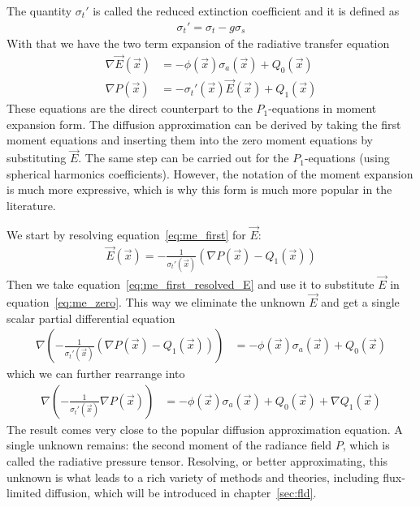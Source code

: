 The quantity $\sigma_t'$ is called the reduced extinction coefficient and it is defined as
\begin{align*}
\sigma_t' = \sigma_t - g\sigma_s
\end{align*}
With that we have the two term expansion of the radiative transfer equation
\begin{align}
\label{eq:me_zero}
\nabla\vec{E}\left(\vec{x}\right)&=
-\phi(\vec{x})\sigma_a(\vec{x})
+Q_0\left(\vec{x}\right)
\\
\label{eq:me_first}
\nabla P\left(\vec{x}\right) &= -\sigma_t'(\vec{x})\vec{E}\left(\vec{x}\right)
+Q_1\left(\vec{x}\right)
\end{align}
These equations are the direct counterpart to the $P_1$-equations in moment expansion form. The diffusion approximation can be derived by taking the first moment equations and inserting them into the zero moment equations by substituting $\vec{E}$. The same step can be carried out for the $P_1$-equations (using spherical harmonics coefficients). However, the notation of the moment expansion is much more expressive, which is why this form is much more popular in the literature.

We start by resolving equation~\ref{eq:me_first} for $\vec{E}$:
\begin{align}
\label{eq:me_first_resolved_E}
\vec{E}\left(\vec{x}\right) =
-\frac{1}{\sigma_t'\left(\vec{x}\right)}
\left(
\nabla P\left(\vec{x}\right)
-Q_1\left(\vec{x}\right)
\right)
\end{align}
Then we take equation~\ref{eq:me_first_resolved_E} and use it to substitute $\vec{E}$ in equation~\ref{eq:me_zero}. This way we eliminate the unknown $\vec{E}$ and get a single scalar partial differential equation
\begin{align}
\nabla
\left(
-\frac{1}{\sigma_t'\left(\vec{x}\right)}
\left(
\nabla P\left(\vec{x}\right)
-Q_1\left(\vec{x}\right)
\right)
\right)&=
-\phi(\vec{x})\sigma_a(\vec{x})
+Q_0\left(\vec{x}\right)
\end{align}
which we can further rearrange into
\begin{align}
\label{eq:general_diffusion_equation}
\nabla
\left(
-\frac{1}{\sigma_t'\left(\vec{x}\right)}
\nabla P\left(\vec{x}\right)
\right)&=
-\phi(\vec{x})\sigma_a(\vec{x})
+Q_0\left(\vec{x}\right)
+\nabla Q_1\left(\vec{x}\right)
\end{align}
The result comes very close to the popular diffusion approximation equation. A single unknown remains: the second moment of the radiance field $P$, which is called the radiative pressure tensor. Resolving, or better approximating, this unknown is what leads to a rich variety of methods and theories, including flux-limited diffusion, which will be introduced in chapter~\ref{sec:fld}.





%

